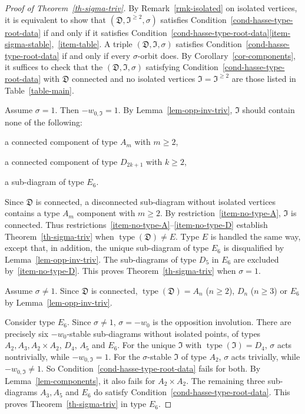\documentclass[11pt]{amsart}
\numberwithin{equation}{section}
\theoremstyle{definition}
\theoremstyle{remark}
\newcommand{\Dfr}{{\mathfrak D}}
\newcommand{\Ifr}{{\mathfrak I}}
\DeclareMathOperator{\type}{type}
\begin{document}
\begin{proof}[Proof of Theorem~\ref{th-sigma-triv}]
By Remark~\ref{rmk-isolated} on isolated vertices, it is equivalent to show that $(\Dfr, \Ifr^{\geq 2}, \sigma)$ satisfies Condition~\ref{cond-hasse-type-root-data} if and only if it satisfies Condition~\ref{cond-hasse-type-root-data}\eqref{item-sigma-stable},~\eqref{item-table}. 
A triple $(\Dfr, \Ifr, \sigma)$ satisfies Condition~\ref{cond-hasse-type-root-data} if and only if every $\sigma$-orbit does. By Corollary~\ref{cor-components}, it suffices to check that the $(\Dfr, \Ifr, \sigma)$ satisfying Condition~\ref{cond-hasse-type-root-data} with $\Dfr$ connected and no isolated vertices $\Ifr=\Ifr^{\geq 2}$ are those listed in Table~\ref{table-main}.

Assume $\sigma=1$. Then $-w_{0,\Ifr}=1$. By Lemma~\ref{lem-opp-inv-triv}, $\Ifr$ should contain none of the following:
\begin{alist}
    \item
    \label{item-no-type-A}
    a connected component of type $A_m$ with $m\geq 2$,
    \item
    \label{item-no-type-D}
    a connected component of type $D_{2k+1}$ with $k \geq 2$,
    \item
    \label{item-no-type-E6}
    a sub-diagram of type $E_6$.
\end{alist}
Since $\Dfr$ is connected, a disconnected sub-diagram without isolated vertices contains a type $A_m$ component with $m \geq 2$. 
By restriction~\eqref{item-no-type-A},  $\Ifr$ is connected. 
Thus restrictions~\eqref{item-no-type-A}--\eqref{item-no-type-D} establish Theorem~\ref{th-sigma-triv} when $\type(\Dfr) \neq E$.  
Type $E$ is handled the same way, except that, in addition, the unique sub-diagram of type $E_6$ is disqualified by Lemma~\ref{lem-opp-inv-triv}. 
The sub-diagrams of type $D_5$ in $E_6$ are excluded by~\eqref{item-no-type-D}. This proves Theorem~\ref{th-sigma-triv} when $\sigma=1$.


Assume $\sigma \neq 1$. Since $\Dfr$ is connected, $\type(\Dfr)=A_n$ ($n \geq 2$), $D_n$ ($n\geq 3$) or $E_6$ by Lemma~\ref{lem-opp-inv-triv}. 

Consider type $E_6$. Since $\sigma \neq 1$, $\sigma=-w_0$ is the opposition involution.  There are precisely six $-w_0$-stable sub-diagrams without isolated points, of types $A_2, A_3, A_2 \times A_2$, $D_4$, $A_5$ and $E_6$. For the unique $\Ifr$ with $\type(\Ifr)=D_4$, $\sigma$ acts nontrivially, while $-w_{0,\Ifr}=1$.  For the $\sigma$-stable $\Ifr$ of type $A_2$, $\sigma$ acts trivially, while $-w_{0,\Ifr} \neq 1$. So Condition~\ref{cond-hasse-type-root-data} fails for both.  By Lemma~\ref{lem-components}, it also fails for $A_2 \times A_2$.  The remaining three sub-diagrams $A_3, A_5$ and $E_6$ do satisfy Condition~\ref{cond-hasse-type-root-data}. This proves Theorem~\ref{th-sigma-triv} in type $E_6$.


\end{proof}
\end{document}
